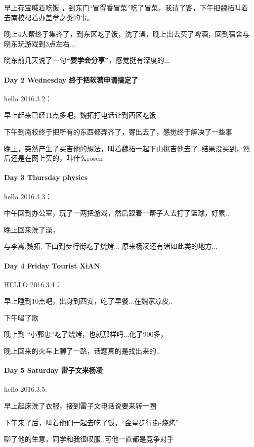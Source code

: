 \documentclass[UTF8,a4paper,8pt]{ctexbook}
\begin{document}
	 	 早上存宝喊着吃饭 ，到东门“冒得香冒菜”吃了冒菜，我请了客，下午把魏拓叫着去南校帮着办盖章之类的事。
	 	 
	 	 晚上4人帮终于集齐了，到东区吃了饭，洗了澡，晚上出去买了啤酒，回到宿舍与晓东玩游戏到3点左右...
	 	 
	 	 晓东前几天说了一句\textbf{“要学会分享”}，感觉挺有深度的...
 	 \paragraph{Day 2   Wednesday    \quad  终于把软著申请搞定了}
	 	 hello 2016.3.2：
	 	 
	 	 早上起来已经11点多吧，魏拓打电话让到西区吃饭
	 	 
	 	 下午到南校终于把所有的东西都弄齐了，寄出去了，感觉终于解决了一些事
	 	 
	 	 晚上，突然产生了买吉他的想法，叫着魏拓一起下山挑吉他去了..结果没买到，然后还是在网上买的，叫什么rosen
 	 \paragraph{Day 3   Thursday    \quad   physics  }
	 	 hello 2016.3.3：
	 	 
	 	 中午回到办公室，玩了一两把游戏，然后跟着一帮子人去打了篮球，好累..
	 	 
	 	 晚上回来洗了澡，
	 	 
	 	 与李嵩.魏拓. 下山到步行街吃了烧烤... 原来杨凌还有诸如此类的地方...
	 	 
 	 \paragraph{Day 4   Friday    \quad   Tourist  XiAN  }
	 	 HELLO 2016.3.4：
	 	 
		 早上睡到10点吧，出身到西安，吃了早餐...在魏家凉皮..
		 
		 下午唱了歌
		 
		 晚上到 “小郭忠”吃了烧烤，也就那样吗...化了900多，
		 
		 晚上回来的火车上聊了一路，话题真的是找出来的..
 	 \paragraph{Day 5   Saturday    \quad  雷子文来杨凌 }
	 	 hello 2016.3.5:
	 	 
	 	 早上起床洗了衣服，接到雷子文电话说要来转一圈
	 	 
	 	 下午来了后，叫着他们一起去吃了饭，“金星步行街-烧烤”
	 	 
	 	 聊了他的生意，同学和我很叹服..可他一直都是竞争对手
	 	 
\end{document}
